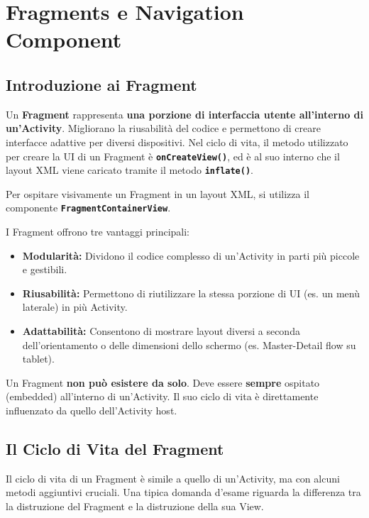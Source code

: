 
\chapter{Fragments e Navigation Component}

\section{Introduzione ai Fragment}
Un \textbf{Fragment} rappresenta \textbf{una porzione di interfaccia utente all'interno di un'Activity}.
Migliorano la riusabilità del codice e permettono di creare interfacce adattive per diversi dispositivi.
Nel ciclo di vita, il metodo utilizzato per creare la UI di un Fragment è \textbf{\texttt{onCreateView()}}, ed è al suo interno che il layout XML viene caricato tramite il metodo \textbf{\texttt{inflate()}}.

Per ospitare visivamente un Fragment in un layout XML, si utilizza il componente \textbf{\texttt{FragmentContainerView}}.

I Fragment offrono tre vantaggi principali:
\begin{itemize}
    \item \textbf{Modularità:} Dividono il codice complesso di un'Activity in parti più piccole e gestibili.
    \item \textbf{Riusabilità:} Permettono di riutilizzare la stessa porzione di UI (es.
    un menù laterale) in più Activity.
    \item \textbf{Adattabilità:} Consentono di mostrare layout diversi a seconda dell'orientamento o delle dimensioni dello schermo (es.
    Master-Detail flow su tablet).
\end{itemize}

\begin{tcolorbox}[colback=red!5!white,colframe=red!75!black,title=Nota per l'esame]
    Un Fragment \textbf{non può esistere da solo}.
    Deve essere \textbf{sempre} ospitato (embedded) all'interno di un'Activity.
    Il suo ciclo di vita è direttamente influenzato da quello dell'Activity host.
\end{tcolorbox}

\section{Il Ciclo di Vita del Fragment}
Il ciclo di vita di un Fragment è simile a quello di un'Activity, ma con alcuni metodi aggiuntivi cruciali.
Una tipica domanda d'esame riguarda la differenza tra la distruzione del Fragment e la distruzione della sua View.

